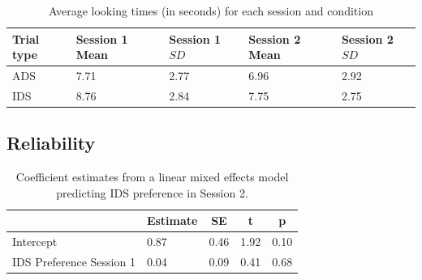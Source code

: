 \documentclass[
  english,
  man,floatsintext]{apa6}
\begin{document}
\begin{table}[tbp]

\begin{center}
\begin{threeparttable}

\caption{\label{tab:descriptives_table1}Average looking times (in seconds) for each session and condition}

\begin{tabular}{lllll}
\toprule
Trial type & Session 1 Mean & Session 1 $SD$ & Session 2 Mean & Session 2 $SD$\\
\midrule
ADS & 7.71 & 2.77 & 6.96 & 2.92\\
IDS & 8.76 & 2.84 & 7.75 & 2.75\\
\bottomrule
\end{tabular}

\end{threeparttable}
\end{center}

\end{table}

\hypertarget{reliability}{%
\subsection{Reliability}\label{reliability}}

\begin{table}[tbp]

\begin{center}
\begin{threeparttable}

\caption{\label{tab:coef_table2}Coefficient estimates from a linear mixed effects model predicting IDS preference in Session 2.}

\begin{tabular}{lllll}
\toprule
 & \multicolumn{1}{c}{Estimate} & \multicolumn{1}{c}{SE} & \multicolumn{1}{c}{t} & \multicolumn{1}{c}{p}\\
\midrule
Intercept & 0.87 & 0.46 & 1.92 & 0.10\\
IDS Preference Session 1 & 0.04 & 0.09 & 0.41 & 0.68\\
\bottomrule
\end{tabular}

\end{threeparttable}
\end{center}

\end{table}
\end{document}
